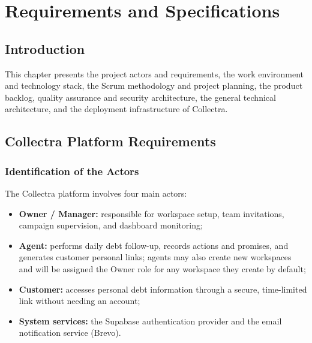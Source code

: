 \documentclass[12pt,a4paper]{report}
\begin{document}
\clearpage
\chapter{Requirements and Specifications}

\section*{Introduction}
{}

This chapter presents the project actors and requirements, the work environment and
technology stack, the Scrum methodology and project planning, the product backlog,
quality assurance and security architecture, the general technical architecture,
and the deployment infrastructure of Collectra.

\section{Collectra Platform Requirements}

\subsection{Identification of the Actors}

The Collectra platform involves four main actors:
\begin{itemize}
  \item \textbf{Owner / Manager:} responsible for workspace setup, team invitations,
        campaign supervision, and dashboard monitoring;
  \item \textbf{Agent:} performs daily debt follow-up, records actions and promises,
      and generates customer personal links; agents may also create new workspaces and
      will be assigned the Owner role for any workspace they create by default;
  \item \textbf{Customer:} accesses personal debt information through a secure,
        time-limited link without needing an account;
  \item \textbf{System services:} the Supabase authentication provider and the
        email notification service (Brevo).
\end{itemize}
\end{document}

